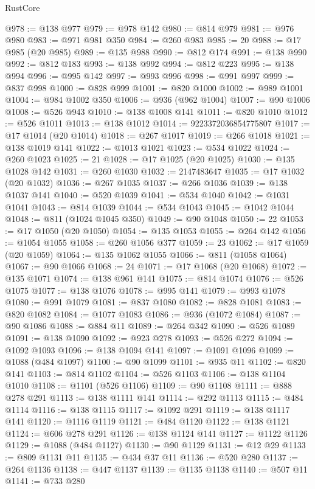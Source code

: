 \begin{lexlean}{RustCore}
\begin{coremodule}
@978 := @138 @977
@979 := @978 @142
@980 := @814 @979
@981 := @976 @980
@983 := @971 @981 @350
@984 := @260 @983
@985 := 20
@988 := @17 @985 (@20 @985)
@989 := @135 @988
@990 := @812 @174
@991 := @138 @990
@992 := @812 @183
@993 := @138 @992
@994 := @812 @223
@995 := @138 @994
@996 := @995 @142
@997 := @993 @996
@998 := @991 @997
@999 := @837 @998
@1000 := @828 @999
@1001 := @820 @1000
@1002 := @989 @1001
@1004 := @984 @1002 @350
@1006 := @936 (@962 @1004)
@1007 := @90 @1006
@1008 := @526 @943
@1010 := @138 @1008 @141
@1011 := @820 @1010
@1012 := @526 @1011
@1013 := @138 @1012
@1014 := 9223372036854775807
@1017 := @17 @1014 (@20 @1014)
@1018 := @267 @1017
@1019 := @266 @1018
@1021 := @138 @1019 @141
@1022 := @1013 @1021
@1023 := @534 @1022
@1024 := @260 @1023
@1025 := 21
@1028 := @17 @1025 (@20 @1025)
@1030 := @135 @1028 @142
@1031 := @260 @1030
@1032 := 2147483647
@1035 := @17 @1032 (@20 @1032)
@1036 := @267 @1035
@1037 := @266 @1036
@1039 := @138 @1037 @141
@1040 := @520 @1039
@1041 := @534 @1040
@1042 := @1031 @1041
@1043 := @814 @1039
@1044 := @534 @1043
@1045 := @1042 @1044
@1048 := @811 (@1024 @1045 @350)
@1049 := @90 @1048
@1050 := 22
@1053 := @17 @1050 (@20 @1050)
@1054 := @135 @1053
@1055 := @264 @142
@1056 := @1054 @1055
@1058 := @260 @1056 @377
@1059 := 23
@1062 := @17 @1059 (@20 @1059)
@1064 := @135 @1062 @1055
@1066 := @811 (@1058 @1064)
@1067 := @90 @1066
@1068 := 24
@1071 := @17 @1068 (@20 @1068)
@1072 := @135 @1071
@1074 := @138 @961 @141
@1075 := @814 @1074
@1076 := @526 @1075
@1077 := @138 @1076
@1078 := @995 @141
@1079 := @993 @1078
@1080 := @991 @1079
@1081 := @837 @1080
@1082 := @828 @1081
@1083 := @820 @1082
@1084 := @1077 @1083
@1086 := @936 (@1072 @1084)
@1087 := @90 @1086
@1088 := @884 @11
@1089 := @264 @342
@1090 := @526 @1089
@1091 := @138 @1090
@1092 := @923 @278
@1093 := @526 @272
@1094 := @1092 @1093
@1096 := @138 @1094 @141
@1097 := @1091 @1096
@1099 := @1088 (@484 @1097)
@1100 := @90 @1099
@1101 := @935 @11
@1102 := @820 @141
@1103 := @814 @1102
@1104 := @526 @1103
@1106 := @138 @1104 @1010
@1108 := @1101 (@526 @1106)
@1109 := @90 @1108
@1111 := @888 @278 @291
@1113 := @138 @1111 @141
@1114 := @292 @1113
@1115 := @484 @1114
@1116 := @138 @1115
@1117 := @1092 @291
@1119 := @138 @1117 @141
@1120 := @1116 @1119
@1121 := @484 @1120
@1122 := @138 @1121
@1124 := @606 @278 @291
@1126 := @138 @1124 @141
@1127 := @1122 @1126
@1129 := @1088 (@484 @1127)
@1130 := @90 @1129
@1131 := @12 @29
@1133 := @809 @1131 @11
@1135 := @434 @37 @11
@1136 := @520 @280
@1137 := @264 @1136
@1138 := @447 @1137
@1139 := @1135 @1138
@1140 := @507 @11
@1141 := @733 @280

\end{coremodule}
\end{lexlean}
